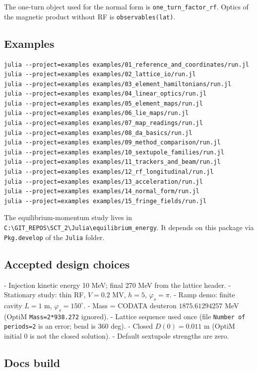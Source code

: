 \documentclass[11pt,a4paper]{article}
\begin{document}
The one-turn object used for the normal form is \texttt{one\_turn\_factor\_rf}.
Optics of the magnetic product without RF is \texttt{observables(lat)}.

\subsection{Examples}

\begin{verbatim}
julia --project=examples examples/01_reference_and_coordinates/run.jl
julia --project=examples examples/02_lattice_io/run.jl
julia --project=examples examples/03_element_hamiltonians/run.jl
julia --project=examples examples/04_linear_optics/run.jl
julia --project=examples examples/05_element_maps/run.jl
julia --project=examples examples/06_lie_maps/run.jl
julia --project=examples examples/07_map_readings/run.jl
julia --project=examples examples/08_da_basics/run.jl
julia --project=examples examples/09_method_comparison/run.jl
julia --project=examples examples/10_sextupole_families/run.jl
julia --project=examples examples/11_trackers_and_beam/run.jl
julia --project=examples examples/12_rf_longitudinal/run.jl
julia --project=examples examples/13_acceleration/run.jl
julia --project=examples examples/14_normal_form/run.jl
julia --project=examples examples/15_fringe_fields/run.jl
\end{verbatim}

The equilibrium-momentum study lives in \texttt{C:\textbackslash{}GIT\_REPOS\textbackslash{}SCT\_2\textbackslash{}Julia\textbackslash{}equilibrium\_energy}.
It depends on this package via \texttt{Pkg.develop} of the \texttt{Julia} folder.

\subsection{Accepted design choices}

- Injection kinetic energy 10 MeV; final 270 MeV from the lattice header.
- Stationary study: thin RF, $V=0.2$ MV, $h=5$, $\varphi_s=\pi$.
- Ramp demo: finite cavity $L=1$ m, $\varphi_s=150^\circ$.
- Mass = CODATA deuteron $1875.61294257$ MeV (OptiM \texttt{Mass=2*938.272} ignored).
- Lattice sequence used once (file \texttt{Number of periods=2} is an error; bend is 360 deg).
- Closed $D(0)=0.011$ m (OptiM initial 0 is not the closed solution).
- Default sextupole strengths are zero.

\subsection{Docs build}
\end{document}
